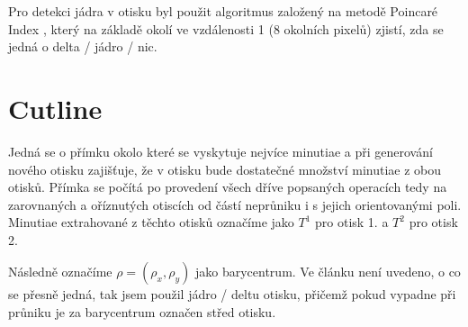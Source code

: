 \documentclass[a4paper,11pt]{article}
\begin{document}
\begin{multicols*}{2}
        Pro detekci jádra v otisku byl použit algoritmus založený na metodě Poincaré Index \cite{pointcare}, který na základě okolí ve vzdálenosti 1 (8 okolních pixelů) zjistí, zda se jedná o delta / jádro / nic.
        
\section{Cutline}
    Jedná se o přímku okolo které se vyskytuje nejvíce minutiae a při generování nového otisku zajišťuje, že v otisku bude dostatečné množství minutiae z obou otisků. Přímka se počítá po provedení všech dříve popsaných operacích tedy na zarovnaných a oříznutých otiscích od částí neprůniku i s jejich orientovanými poli. Minutiae extrahované z těchto otisků označíme jako $T^1$ pro otisk 1. a $T^2$ pro otisk 2.
    
    Následně označíme $\rho = (\rho_x, \rho_y)$ jako barycentrum. Ve článku není uvedeno, o co se přesně jedná, tak jsem použil jádro / deltu otisku, přičemž pokud vypadne při průniku je za barycentrum označen střed otisku.
    

\end{multicols*}
\end{document}
